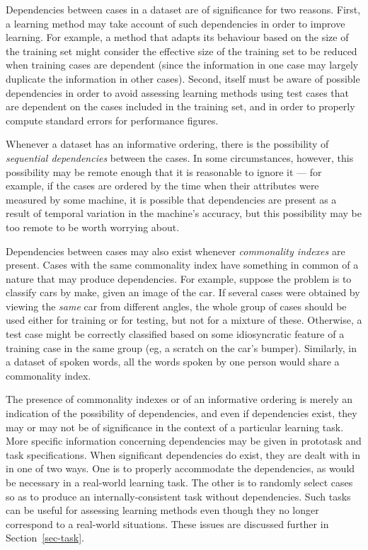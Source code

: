 Dependencies between cases in a dataset are of significance for two
reasons.  First, a learning method may take account of such
dependencies in order to improve learning.  For example, a method that
adapts its behaviour based on the size of the training set might
consider the effective size of the training set to be reduced when
training cases are dependent (since the information in one case may
largely duplicate the information in other cases).  Second, \delve{}
itself must be aware of possible dependencies in order to avoid
assessing learning methods using test cases that are dependent on the
cases included in the training set, and in order to properly compute
standard errors for performance figures.

Whenever a dataset has an informative ordering, there is the
possibility of \emph{sequential dependencies} between the cases.  In
some circumstances, however, this possibility may be remote enough
that it is reasonable to ignore it --- for example, if the cases are
ordered by the time when their attributes were measured by some
machine, it is possible that dependencies are present as a result of
temporal variation in the machine's accuracy, but this possibility
may be too remote to be worth worrying about.

Dependencies between cases may also exist whenever \emph{commonality
indexes} are present.  Cases with the same commonality index have
something in common of a nature that may produce dependencies.  For
example, suppose the problem is to classify cars by make, given an
image of the car.  If several cases were obtained by viewing the
\emph{same} car from different angles, the whole group of cases should
be used either for training or for testing, but not for a mixture of
these.  Otherwise, a test case might be correctly classified based on
some idiosyncratic feature of a training case in the same group (eg, a
scratch on the car's bumper).  Similarly, in a dataset of spoken
words, all the words spoken by one person would share a commonality
index.

The presence of commonality indexes or of an informative ordering is
merely an indication of the possibility of dependencies, and even if
dependencies exist, they may or may not be of significance in the
context of a particular learning task.  More specific information
concerning dependencies may be given in prototask and task
specifications.  When significant dependencies do exist, they are
dealt with in \delve{} in one of two ways.  One is to properly
accommodate the dependencies, as would be necessary in a real-world
learning task.  The other is to randomly select cases so as to produce
an internally-consistent task without dependencies.  Such tasks can be
useful for assessing learning methods even though they no longer
correspond to a real-world situations.  These issues are discussed
further in Section~\ref{sec-task}.

